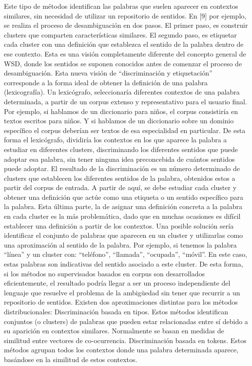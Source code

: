 Este tipo de métodos identifican las palabras que suelen aparecer en contextos similares, sin necesidad de utilizar un repositorio de sentidos. En [9] por ejemplo, se realiza el proceso de desambiguación en dos pasos. El primer paso, es construir clusters que comparten características similares. El segundo paso, es etiquetar cada cluster con una definición que establezca el sentido de la palabra dentro de ese contexto. Esta es una visión completamente diferente del concepto general de WSD, donde los sentidos se suponen conocidos antes de comenzar el proceso de desambiguación. Esta nueva visión de “discriminación y etiquetación” corresponde a la forma ideal de obtener la definición de una palabra (lexicografía). Un lexicógrafo, seleccionaría diferentes contextos de una palabra determinada, a partir de un corpus extenso y representativo para el usuario final. Por ejemplo, si hablamos de un diccionario para niños, el corpus consistiría en textos escritos para niños. Y si hablamos de un diccionario sobre un dominio específico el corpus deberían ser textos de esa especialidad en particular. De esta forma el lexicógrafo, dividiría los contextos en los que aparece la palabra a estudiar en diferentes clusters, discriminando los diferentes sentidos que puede adoptar esa palabra, sin tener ninguna idea preconcebida de cuántos sentidos puede adoptar. El resultado de la discriminación es un número determinado de clusters que establecen los diferentes sentidos de la palabra, obtenidos estos a partir del corpus de entrada. A partir de aquí, se debe estudiar cada cluster y obtener una definición que actúe como una etiqueta o un sentido específico para la palabra. Esta última parte, la de asignar una definición concreta a la palabra en cada cluster es la más problemática, dado que en muchas ocasiones es difícil establecer una definición a partir de los contextos. Una posible solución sería identificar el conjunto de palabras que aparecen en un cluster y utilizarlas como una aproximación al sentido de la palabra. Por ejemplo, si tenemos la palabra “línea” y un cluster con: “teléfono”, “llamada”, “ocupada”, “móvil”. En este caso, estas palabras son indicativas del sentido asociado a este cluster. De esta forma, si los métodos no supervisados basados en corpus son desarrollados eficientemente, el resultado podría llegar a ser un proceso independiente del lenguaje que resuelve el problema de la ambigüedad sin tener que recurrir a un repositorio de sentidos. Existen dos aproximaciones distintas para los métodos distribucionales: Discriminación basada en tipos. Estos métodos identifican conjuntos (o clusters) de palabras que pueden estar relacionadas entre sí debido a su aparición en contextos similares. Normalmente se basan en medidas de similitud entre vectores de co-ocurrencia. Discriminación basada en tokens. Estos métodos agrupan todos los contextos donde una palabra determinada aparece, basándose en la similitud de estos contextos.

